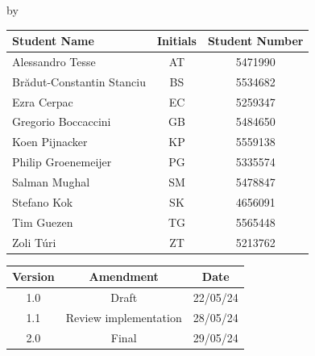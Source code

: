 
\begin{titlepage}

\begin{center}

{\makeatletter
\largetitlestyle\fontsize{45}{45}\selectfont\@title
\makeatother}

{\makeatletter
\ifdefvoid{\@subtitle}{}{\bigskip\titlestyle\fontsize{35}{35}\selectfont\@subtitle}
\makeatother}

\bigskip
\bigskip

by

\bigskip
\bigskip

{\makeatletter
\largetitlestyle\fontsize{25}{25}\selectfont\@author
\makeatother}

\bigskip
\bigskip

\setlength\extrarowheight{2pt}
\begin{tabular}{lcc}
    Student Name              &Initials& Student Number \\\midrule
    Alessandro Tesse          &AT& 5471990 \\
    Brădut-Constantin Stanciu &BS& 5534682 \\
    Ezra Cerpac               &EC& 5259347 \\
    Gregorio Boccaccini       &GB& 5484650 \\
    Koen Pijnacker            &KP& 5559138 \\
    Philip Groenemeijer       &PG& 5335574 \\
    Salman Mughal             &SM& 5478847 \\
    Stefano Kok               &SK& 4656091 \\
    Tim Guezen                &TG& 5565448 \\
    Zoli Túri                 &ZT& 5213762 \\
\end{tabular}

\vfill

\begin{table}[ht]
    \centering
    \label{tab:verscontr}
    \begin{tabular}{ccc}
        Version &  Amendment             & Date       \\ \midrule
        1.0     & Draft                  & 22/05/24   \\
        1.1     &  Review implementation & 28/05/24   \\
        2.0     &  Final & 29/05/24   \\
        

\end{tabular}
\end{table}
\end{center}
\end{titlepage}
